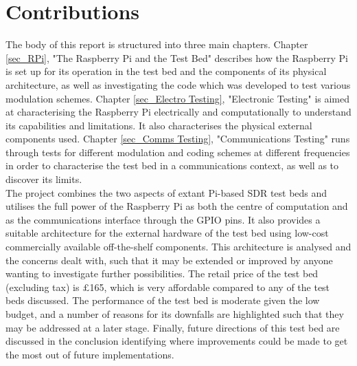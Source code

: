 \documentclass[../main.tex]{subfiles}
\begin{document}

\section{Contributions}

The body of this report is structured into three main chapters.
Chapter \ref{sec_RPi}, "The Raspberry Pi and the Test Bed" describes how the Raspberry Pi is set up for its operation in the test bed and the components of its physical architecture, as well as investigating the code which was developed to test various modulation schemes.
Chapter \ref{sec_Electro Testing}, "Electronic Testing" is aimed at characterising the Raspberry Pi electrically and computationally to understand its capabilities and limitations.
It also characterises the physical external components used.
Chapter \ref{sec_Comms Testing}, "Communications Testing" runs through tests for different modulation and coding schemes at different frequencies in order to characterise the test bed in a communications context, as well as to discover its limits.\\

The project combines the two aspects of extant Pi-based SDR test beds and utilises the full power of the Raspberry Pi as both the centre of computation and as the communications interface through the GPIO pins.
It also provides a suitable architecture for the external hardware of the test bed using low-cost commercially available off-the-shelf components.
This architecture is analysed and the concerns dealt with, such that it may be extended or improved by anyone wanting to investigate further possibilities.
The retail price of the test bed (excluding tax) is $\mathsterling$165, which is very affordable compared to any of the test beds discussed.
The performance of the test bed is moderate given the low budget, and a number of reasons for its downfalls are highlighted such that they may be addressed at a later stage.
Finally, future directions of this test bed are discussed in the conclusion identifying where improvements could be made to get the most out of future implementations.
\end{document}
